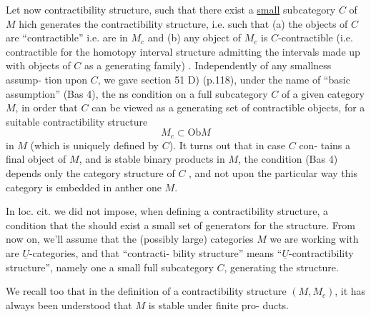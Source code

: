 
 Let now
 contractibility structure, such that
there exist a \uline{small}  subcategory $C$ of $M$ 
hich generates the contractibility structure, i.e. such that 
(a) the objects of $C$ are ``contractible'' i.e. are in $M_c$ and (b) any
object of $M_c$  is $C$-contractible (i.e. contractible for the homotopy
interval structure admitting the intervals made up with objects of $C$ as
a generating family)\hand{,}  . Independently of any smallness assump-%
tion upon $C$, we gave  section 51 D)  (p.118), under the name
of ``basic assumption'' (Bas 4), the ns condition on a full subcategory
$C$ of a given category $M$, in order that $C$ can be viewed as a generating
set of contractible objects, for a suitable contractibility structure
\[ M_c \subset \mathrm{Ob} M \]
in $M$ (which is uniquely defined by $C$). It turns out that in case $C$ con-%
 tains a final object of $M$, and is stable   binary products in
$M$, the condition (Bas 4)  depends only   the category structure
of $C$ , and not upon the particular way this category is embedded in
anther one $M$.

In loc. cit. we did not impose, when defining a contractibility
structure, a condition that the should exist a small set of generators
for the structure. From now on, we'll assume that the (possibly large)
categories $M$ we are working with are $\underline{U}$-categories, and that ``contracti-%
bility structure'' means ``$\underline{U}$-contractibility structure'', namely one  
  a small full subcategory $C$, generating the structure.

We recall too that in the definition of a contractibility structure
$(M,M_c)$, it has always been understood that $M$ is stable under finite pro-%
ducts.

